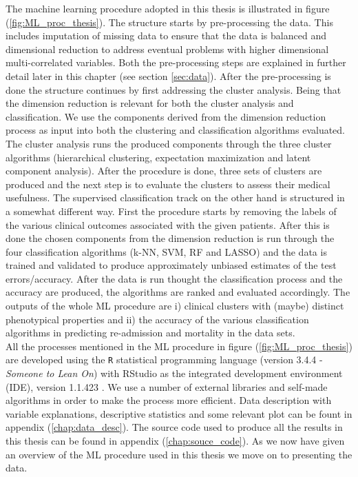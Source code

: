 \documentclass[../thesis.tex]{subfiles}
\begin{document}
\indent The machine learning procedure adopted in this thesis is illustrated in figure (\ref{fig:ML_proc_thesis}). The structure starts by pre-processing the data. This includes imputation of missing data to ensure that the data is balanced and dimensional reduction to address eventual problems with higher dimensional multi-correlated variables. Both the pre-processing steps are explained in further detail later in this chapter (see section \ref{sec:data}). After the pre-processing is done the structure continues by first addressing the cluster analysis. Being that the dimension reduction is relevant for both the cluster analysis and classification. We use the components derived from the dimension reduction process as input into both the clustering and classification algorithms evaluated. The cluster analysis runs the produced components through the three cluster algorithms (hierarchical clustering, expectation maximization and latent component analysis). After the procedure is done, three sets of clusters are produced and the next step is to evaluate the clusters to assess their medical usefulness. The supervised classification track on the other hand is structured in a somewhat different way. First the procedure starts by removing the labels of the various clinical outcomes associated with the given patients. After this is done the chosen components from the dimension reduction is run through the four classification algorithms (k-NN, SVM, RF and LASSO) and the data is trained and validated to produce approximately unbiased estimates of the test errors/accuracy. After the data is run thought the classification process and the accuracy are produced, the algorithms are ranked and evaluated accordingly. The outputs of the whole ML procedure are i) clinical clusters with (maybe) distinct phenotypical properties and ii) the accuracy of the various classification algorithms in predicting re-admission and mortality in the data sets.\\
\indent All the processes mentioned in the ML procedure in figure (\ref{fig:ML_proc_thesis}) are developed using the \texttt{R} statistical programming language (version 3.4.4 - \textit{Someone to Lean On}) \citep{Rsoftware2018} with RStudio as the integrated development environment (IDE), version 1.1.423 \citep{RStudio2018}. We use a number of external libraries and self-made algorithms in order to make the process more efficient. Data description with variable explanations, descriptive statistics and some relevant plot can be fount in appendix (\ref{chap:data_desc}). The source code used to produce all the results in this thesis can be found in appendix (\ref{chap:souce_code}). As we now have given an overview of the ML procedure used in this thesis we move on to presenting the data.
\end{document}
